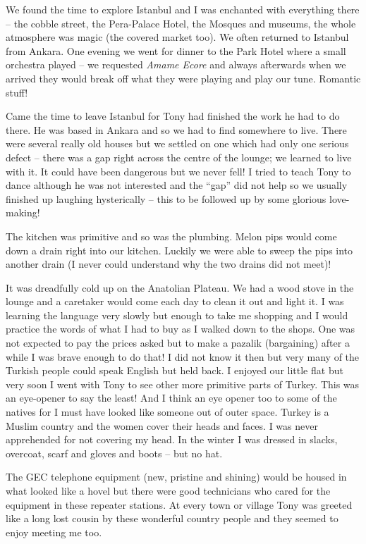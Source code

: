 We found the time to explore Istanbul and I was enchanted with
everything there -- the cobble street, the Pera-Palace Hotel, the
Mosques and museums, the whole atmosphere was magic (the covered
market too). We often returned to Istanbul from Ankara. One evening we
went for dinner to the Park Hotel where a small orchestra played -- we
requested \textit{Amame Ecore} and always afterwards when we arrived
they would break off what they were playing and play our
tune. Romantic stuff!

Came the time to leave Istanbul for Tony had finished the work he had
to do there. He was based in Ankara and so we had to find somewhere to
live. There were several really old houses but we settled on one which
had only one serious defect -- there was a gap right across the centre
of the lounge; we learned to live with it. It could have been
dangerous but we never fell! I tried to teach Tony to dance although
he was not interested and the ``gap'' did not help so we usually
finished up laughing hysterically -- this to be followed up by some
glorious love-making!

The kitchen was primitive and so was the plumbing. Melon pips would
come down a drain right into our kitchen. Luckily we were able to
sweep the pips into another drain (I never could understand why the
two drains did not meet)!

It was dreadfully cold up on the Anatolian Plateau. We had a wood
stove in the lounge and a caretaker would come each day to clean it
out and light it. I was learning the language very slowly but enough
to take me shopping and I would practice the words of what I had to
buy as I walked down to the shops. One was not expected to pay the
prices asked but to make a pazalik (bargaining) after a while I was
brave enough to do that! I did not know it then but very many of the
Turkish people could speak English but held back. I enjoyed our little
flat but very soon I went with Tony to see other more primitive parts
of Turkey. This was an eye-opener to say the least! And I think an eye
opener too to some of the natives for I must have looked like someone
out of outer space. Turkey is a Muslim country and the women cover
their heads and faces. I was never apprehended for not covering my
head. In the winter I was dressed in slacks, overcoat, scarf and
gloves and boots -- but no hat.

The GEC telephone equipment (new, pristine and shining) would be
housed in what looked like a hovel but there were good technicians who
cared for the equipment in these repeater stations. At every town or
village Tony was greeted like a long lost cousin by these wonderful
country people and they seemed to enjoy meeting me too.

